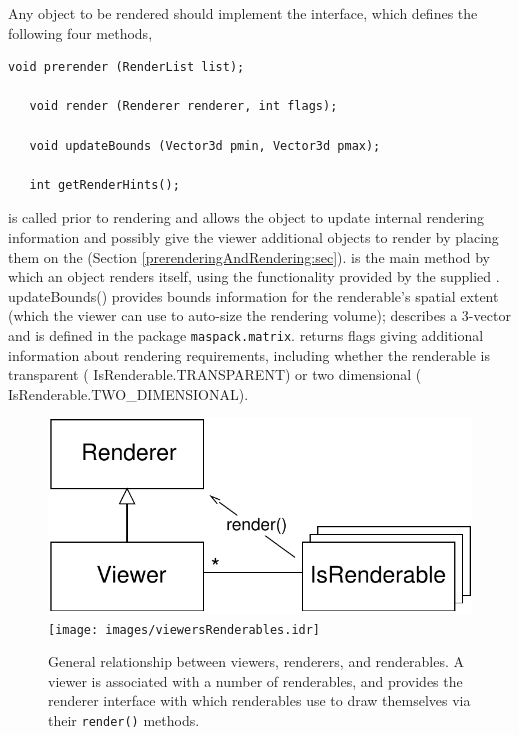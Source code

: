 Any object to be rendered should implement the
 interface, which defines the
following four methods,
%
\begin{lstlisting}[]
   void prerender (RenderList list);

   void render (Renderer renderer, int flags);

   void updateBounds (Vector3d pmin, Vector3d pmax);

   int getRenderHints();
\end{lstlisting}
%
is called prior to rendering and allows the object to update internal
rendering information and possibly give the viewer additional objects
to render by placing them on the
 (Section
\ref{prerenderingAndRendering:sec}).
 is the
main method by which an object renders itself, using the functionality
provided by the supplied .
%
{updateBounds()} provides bounds information for the renderable's
spatial extent (which the viewer can use to auto-size the rendering
volume);  describes a 3-vector and
is defined in the package {\tt maspack.matrix}.
 returns
flags giving additional information about rendering requirements,
including whether the renderable is transparent
(%
{IsRenderable.TRANSPARENT}) or two dimensional
(%
{IsRenderable.TWO\_DIMENSIONAL}).
%
\begin{figure}[t]
\begin{center}
\iflatexml
 \includegraphics[]{images/viewersRenderables}
\else
 \texttt{[image: images/viewersRenderables.idr]}
\fi
\end{center}
\caption{General relationship between viewers, renderers, and
renderables. A viewer is associated with a number of renderables, and
provides the renderer interface with which renderables use to draw
themselves via their {\tt render()} methods.}
\label{viewersRenderables:fig}
\end{figure}
%


